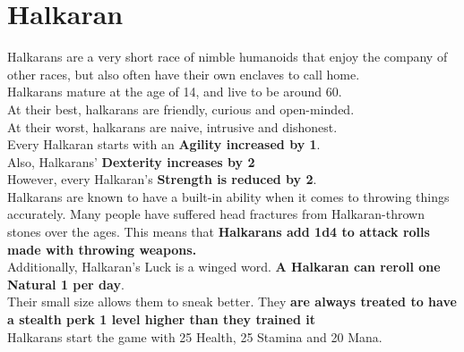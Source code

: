 \section{Halkaran}\label{race:halkara}
Halkarans are a very short race of nimble humanoids that enjoy the company of other races, but also often have their own enclaves to call home.\\
Halkarans mature at the age of 14, and live to be around 60.\\
At their best, halkarans are friendly, curious and open-minded.\\
At their worst, halkarans are naive, intrusive and dishonest.\\
Every Halkaran starts with an \textbf{Agility increased by 1}.\\
Also, Halkarans' \textbf{Dexterity increases by 2}\\
However, every Halkaran's \textbf{Strength is reduced by 2}.\\
Halkarans are known to have a built-in ability when it comes to throwing things accurately.
Many people have suffered head fractures from Halkaran-thrown stones over the ages.
This means that \textbf{Halkarans add 1d4 to attack rolls made with throwing weapons.}\\
Additionally, Halkaran's Luck is a winged word. \textbf{A Halkaran can reroll one Natural 1 per day}.\\
Their small size allows them to sneak better.
They \textbf{are always treated to have a stealth perk 1 level higher than they trained it}\\
Halkarans start the game with 25 Health, 25 Stamina and 20 Mana.